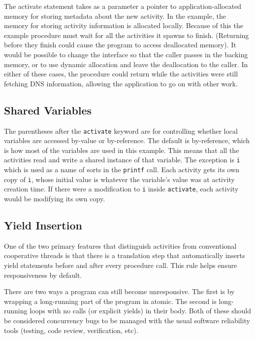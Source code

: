 \documentclass[acmsmall,anonymous,review]{acmart}\settopmatter{printfolios=true,printccs=false,printacmref=false}
\begin{document}
The activate statement takes as a parameter a pointer to application-allocated memory for storing metadata about the new activity.
In the example, the memory for storing activity information is allocated locally.
Because of this the example procedure must wait for all the activities it spawns to finish.
(Returning before they finish could cause the program to access deallocated memory).
It would be possible to change the interface so that the caller passes in the backing memory, or to use dynamic allocation and leave the deallocation to the caller.
In either of these cases, the procedure could return while the activities were still fetching DNS information, allowing the application to go on with other work.

\subsection{Shared Variables}

The parentheses after the \texttt{activate} keyword are for controlling whether local variables are accessed by-value or by-reference.
The default is by-reference, which is how most of the variables are used in this example.
This means that all the activities read and write a shared instance of that variable.
The exception is \texttt{i} which is used as a name of sorts in the \texttt{printf} call.
Each activity gets its own copy of \texttt{i}, whose initial value is whatever the variable's value was at activity creation time.
If there were a modification to \texttt{i} inside \texttt{activate}, each activity would be modifying its own copy.

\subsection{Yield Insertion}

One of the two primary features that distinguish activities from conventional cooperative threads is that there is a translation step that automatically inserts yield statements before and after every procedure call.
This rule helps ensure responsiveness by default.

There are two ways a program can still become unresponsive.
The first is by wrapping a long-running part of the program in atomic.
The second is long-running loops with no calls (or explicit yields) in their body.
Both of these should be considered concurrency bugs to be managed with the usual software reliability tools (testing, code review, verification, etc).
\end{document}
